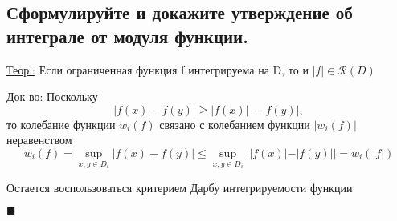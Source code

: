 
\subsection{Сформулируйте и докажите утверждение об интеграле от модуля функции.}
\underline{Теор.:} 
    Если ограниченная функция f интегрируема на D, то и $|f| \in \mathcal{R}(D)$


\underline{Док-во:} 
    Поскольку \[ |f(x) - f(y)| \geq |f(x)| - |f(y)|,\] то колебание функции $w_i(f)$ связано с колебанием функции $|w_i(f)|$ неравенством \[w_i(f) = \sup\limits_{x, y \in D_i} |f(x) - f(y)| \leq \sup\limits_{x, y \in D_i} ||f(x)| - |f(y)|| = w_i(|f|)\]
    
    Остается воспользоваться критерием Дарбу интегрируемости функции
    \begin{flushright}
    $\blacksquare$
    \end{flushright}



